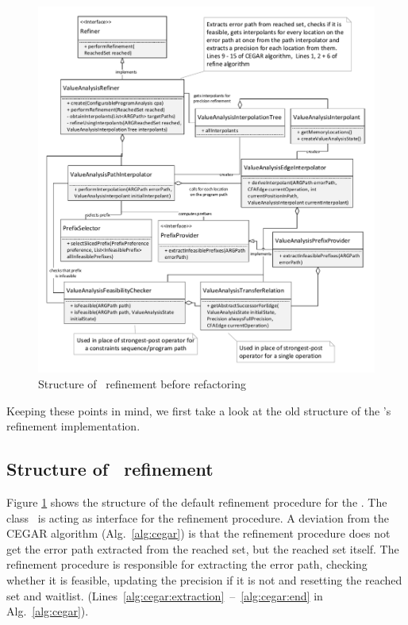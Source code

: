 \begin{figure}
\centering
\includegraphics[width=\linewidth]{implementationCegar/ValueAnalysisRefinementBefore}
\caption{Structure of \ refinement before refactoring}
\label{fig:valRefinementBefore}
\end{figure}

Keeping these points  in mind, we first take a look at the old structure of the 's refinement implementation.

\subsection{Structure of \ refinement}
Figure \ref{fig:valRefinementBefore} shows the structure of the default refinement procedure for the .
The class \ is acting as interface for the refinement procedure.
A deviation from the CEGAR algorithm (Alg.~\ref{alg:cegar}) is that the refinement procedure does not get the error path extracted from the reached set, but the reached set itself.
The refinement procedure is responsible for extracting the error path, checking whether it is feasible, updating the precision if it is not and resetting the reached set and waitlist. (Lines~\ref{alg:cegar:extraction}~--~\ref{alg:cegar:end} in Alg.~\ref{alg:cegar}).

